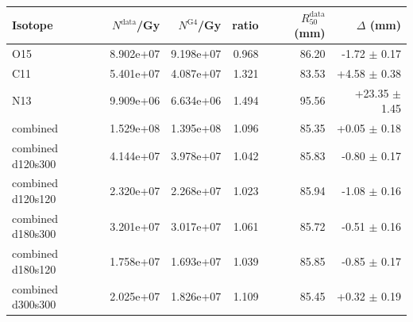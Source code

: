 \begin{tabular}{lrrrrr}
\toprule
Isotope & $N^{\mathrm{data}}$/Gy & $N^{\mathrm{G4}}$/Gy & ratio & $R_{50}^{\mathrm{data}}$ (mm) & $\Delta$ (mm) \\
\midrule
O15 & 8.902e+07 & 9.198e+07 & 0.968 & 86.20 & -1.72 $\pm$ 0.17 \\
C11 & 5.401e+07 & 4.087e+07 & 1.321 & 83.53 & +4.58 $\pm$ 0.38 \\
N13 & 9.909e+06 & 6.634e+06 & 1.494 & 95.56 & +23.35 $\pm$ 1.45 \\
combined & 1.529e+08 & 1.395e+08 & 1.096 & 85.35 & +0.05 $\pm$ 0.18 \\
combined d120s300 & 4.144e+07 & 3.978e+07 & 1.042 & 85.83 & -0.80 $\pm$ 0.17 \\
combined d120s120 & 2.320e+07 & 2.268e+07 & 1.023 & 85.94 & -1.08 $\pm$ 0.16 \\
combined d180s300 & 3.201e+07 & 3.017e+07 & 1.061 & 85.72 & -0.51 $\pm$ 0.16 \\
combined d180s120 & 1.758e+07 & 1.693e+07 & 1.039 & 85.85 & -0.85 $\pm$ 0.17 \\
combined d300s300 & 2.025e+07 & 1.826e+07 & 1.109 & 85.45 & +0.32 $\pm$ 0.19 \\
\bottomrule
\end{tabular}

